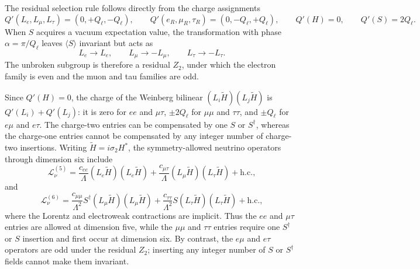 \documentclass[12pt,a4paper]{article}
\begin{document}
The residual selection rule follows directly from the charge assignments
\[
Q'(L_e,L_\mu,L_\tau)=(0,+Q_\ell,-Q_\ell),\qquad
Q'(e_R,\mu_R,\tau_R)=(0,-Q_\ell,+Q_\ell),\qquad
Q'(H)=0,\qquad Q'(S)=2Q_\ell.
\]
When \(S\) acquires a vacuum expectation value, the transformation with phase
\(\alpha=\pi/Q_\ell\) leaves \(\langle S\rangle\) invariant but acts as
\[
L_e\longrightarrow L_e,\qquad
L_\mu\longrightarrow-L_\mu,\qquad
L_\tau\longrightarrow-L_\tau.
\]
The unbroken subgroup is therefore a residual \(Z_2\), under which the electron family is even and the muon and tau families are odd.

Since \(Q'(H)=0\), the charge of the Weinberg bilinear \((L_i\widetilde H)(L_j\widetilde H)\) is \(Q'(L_i)+Q'(L_j)\): it is zero for \(ee\) and \(\mu\tau\), \(\pm2Q_\ell\) for \(\mu\mu\) and \(\tau\tau\), and \(\pm Q_\ell\) for \(e\mu\) and \(e\tau\). The charge-two entries can be compensated by one \(S\) or \(S^\dagger\), whereas the charge-one entries cannot be compensated by any integer number of charge-two insertions.
Writing \(\widetilde H=i\sigma_2H^*\), the symmetry-allowed neutrino operators through dimension six include
\[
\mathcal L_{\nu}^{(5)}
=
\frac{c_{ee}}{\Lambda}(L_e\widetilde H)(L_e\widetilde H)
+\frac{c_{\mu\tau}}{\Lambda}(L_\mu\widetilde H)(L_\tau\widetilde H)
+\mathrm{h.c.},
\]
and
\[
\mathcal L_{\nu}^{(6)}
=
\frac{c_{\mu\mu}}{\Lambda^2}S^\dagger
(L_\mu\widetilde H)(L_\mu\widetilde H)
+\frac{c_{\tau\tau}}{\Lambda^2}S
(L_\tau\widetilde H)(L_\tau\widetilde H)
+\mathrm{h.c.},
\]
where the Lorentz and electroweak contractions are implicit. Thus the \(ee\) and \(\mu\tau\) entries are allowed at dimension five, while the \(\mu\mu\) and \(\tau\tau\) entries require one \(S^\dagger\) or \(S\) insertion and first occur at dimension six. By contrast, the \(e\mu\) and \(e\tau\) operators are odd under the residual \(Z_2\); inserting any integer number of \(S\) or \(S^\dagger\) fields cannot make them invariant.
\end{document}
